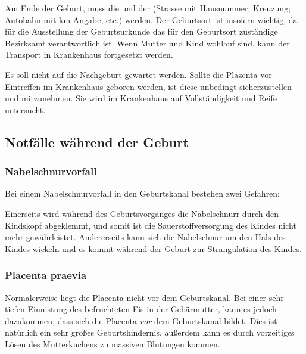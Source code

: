 Am
Ende der Geburt, muss die  und der  (Strasse mit
Hausnummer; Kreuzung; Autobahn mit km Angabe, etc.)  werden.
Der Geburtsort ist insofern wichtig, da für die Ausstellung der Geburtsurkunde  das für den
Geburtsort zuständige Bezirksamt verantwortlich ist. Wenn Mutter und Kind wohlauf
sind, kann der Transport in Krankenhaus fortgesetzt werden. 

Es soll nicht auf
die Nachgeburt gewartet werden. Sollte die Plazenta vor Eintreffen im
Krankenhaus geboren werden, ist diese unbedingt sicherzustellen und mitzunehmen.
Sie wird im Krankenhaus auf Vollständigkeit und Reife untersucht.







\subsection{Notfälle während der Geburt}

\subsubsection{Nabelschnurvorfall}

Bei einem Nabelschnurvorfall in den Geburtskanal bestehen zwei Gefahren:

Einerseits wird während des Geburtsvorganges die Nabelschnurr durch den
Kindskopf abgeklemmt, und somit ist die Sauerstoffversorgung des Kindes nicht mehr
gewährleistet. Andererseits kann sich die Nabelschnur  um den Hals
des Kindes wickeln und es kommt während der Geburt zur Strangulation des
Kindes.


\subsubsection{Placenta praevia}

Normalerweise liegt die Placenta nicht vor dem Geburtskanal. Bei einer sehr
tiefen Einnistung des befruchteten Eis in der Gebärmutter, kann es jedoch
dazukommen, dass sich die Placenta \emph{vor} dem Geburtskanal bildet. Dies ist
natürlich ein sehr großes Geburtshindernis, außerdem kann
es durch vorzeitiges Lösen des Mutterkuchens zu massiven Blutungen kommen.


